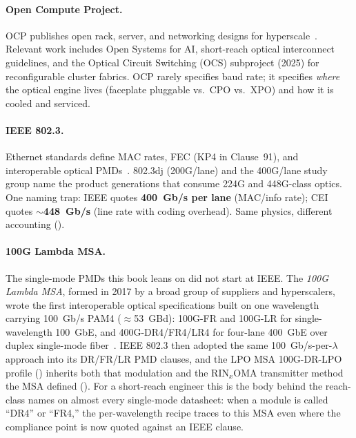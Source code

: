 \paragraph{Open Compute Project.} OCP publishes open rack, server, and networking
designs for hyperscale~. Relevant work includes Open
Systems for AI, short-reach optical interconnect guidelines, and the Optical
Circuit Switching (OCS) subproject (2025) for reconfigurable cluster fabrics.
OCP rarely specifies baud rate; it specifies \emph{where} the optical engine
lives (faceplate pluggable vs.\ CPO vs.\ XPO) and how it is cooled and serviced.

\paragraph{IEEE 802.3.} Ethernet standards define MAC rates, FEC (KP4 in
Clause~91), and interoperable optical PMDs~.
802.3dj (200G/lane) and the 400G/lane study group name the product generations
that consume 224G and 448G-class optics. One naming trap: IEEE quotes
\textbf{400~Gb/s per lane} (MAC/info rate); CEI quotes \textbf{$\sim$448~Gb/s}
(line rate with coding overhead). Same physics, different accounting
().

\paragraph{100G Lambda MSA.} The single-mode PMDs this book leans on did not start
at IEEE. The \emph{100G Lambda MSA}, formed in 2017 by a broad group of suppliers
and hyperscalers, wrote the first interoperable optical specifications built on one
wavelength carrying 100~Gb/s PAM4 ($\approx$53~GBd): 100G-FR and 100G-LR for
single-wavelength 100~GbE, and 400G-DR4/FR4/LR4 for four-lane 400~GbE over duplex
single-mode fiber~. IEEE 802.3 then adopted the same
100~Gb/s-per-$\lambda$ approach into its DR/FR/LR PMD clauses, and the LPO MSA
100G-DR-LPO profile () inherits both that modulation and the
RIN$_x$OMA transmitter method the MSA defined (). For a short-reach
engineer this is the body behind the reach-class names on almost every single-mode
datasheet: when a module is called ``DR4'' or ``FR4,'' the per-wavelength recipe
traces to this MSA even where the compliance point is now quoted against an IEEE
clause.

